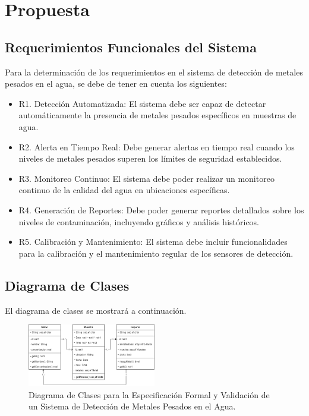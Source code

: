 \section{Propuesta}
\subsection{Requerimientos Funcionales del Sistema}
Para la determinación de los requerimientos en el sistema de detección de metales pesados en el agua, se debe de tener en cuenta los siguientes:

\begin{itemize}
    \item R1. Detección Automatizada: El sistema debe ser capaz de detectar automáticamente la presencia de metales pesados específicos en muestras de agua.
    \item R2. Alerta en Tiempo Real: Debe generar alertas en tiempo real cuando los niveles de metales pesados superen los límites de seguridad establecidos.
    \item R3. Monitoreo Continuo: El sistema debe poder realizar un monitoreo continuo de la calidad del agua en ubicaciones específicas.
    \item R4. Generación de Reportes: Debe poder generar reportes detallados sobre los niveles de contaminación, incluyendo gráficos y análisis históricos.
    \item R5. Calibración y Mantenimiento: El sistema debe incluir funcionalidades para la calibración y el mantenimiento regular de los sensores de detección.
\end{itemize}

\subsection{Diagrama de Clases}
El diagrama de clases se mostrará a continuación.

\begin{figure}[h]
    \centering
    \includegraphics[width=0.5\textwidth]{Recursos/Metodos_Formales-DCL.png}
    \caption{Diagrama de Clases para la Especificación Formal y Validación de un Sistema de Detección de Metales Pesados en el Agua.}
\end{figure}

